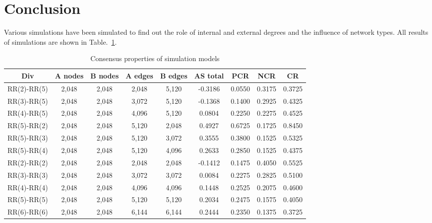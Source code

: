 \section{Conclusion}
Various simulations have been simulated to find out the role of internal and external degrees and the influence of network types. All results of simulations are shown in Table.~\ref{Consensus properties of Simulation Models}. 
\begin{table}[!htb]
	\scriptsize
	\centering
    \caption{Consensus properties of simulation models}
	\label{Consensus properties of Simulation Models}
	\begin{center}
		\begin{tabular}{c|c|c|c|c|c|c|c|c} \hline\hline
			Div                    & A nodes& B nodes & A edges & B edges & AS total  & PCR    & NCR    & CR       \\ \hline \hline
			RR(2)-RR(5)            & 2,048  & 2,048   & 2,048   & 5,120   & -0.3186   & 0.0550 & 0.3175 & 0.3725   \\ \hline
			RR(3)-RR(5)            & 2,048  & 2,048   & 3,072   & 5,120   & -0.1368   & 0.1400 & 0.2925 & 0.4325   \\ \hline
			RR(4)-RR(5)            & 2,048  & 2,048   & 4,096   & 5,120   &  0.0804   & 0.2250 & 0.2275 & 0.4525   \\ \hline
			RR(5)-RR(2)            & 2,048 	& 2,048   & 5,120   & 2,048   &  0.4927   & 0.6725 & 0.1725 & 0.8450   \\ \hline	
			RR(5)-RR(3)            & 2,048 	& 2,048   & 5,120   & 3,072   &  0.3555   & 0.3800 & 0.1525 & 0.5325   \\ \hline
			RR(5)-RR(4)            & 2,048  & 2,048   & 5,120   & 4,096   &  0.2633   & 0.2850 & 0.1525 & 0.4375   \\ \hline
			RR(2)-RR(2)            & 2,048  & 2,048   & 2,048   & 2,048   & -0.1412   & 0.1475 & 0.4050 & 0.5525   \\ \hline
			RR(3)-RR(3)            & 2,048  & 2,048   & 3,072   & 3,072   &  0.0084   & 0.2275 & 0.2825 & 0.5100   \\ \hline
			RR(4)-RR(4)            & 2,048  & 2,048   & 4,096   & 4,096   &  0.1448   & 0.2525 & 0.2075 & 0.4600   \\ \hline
			RR(5)-RR(5)            & 2,048  & 2,048   & 5,120   & 5,120   &  0.2034   & 0.2475 & 0.1575 & 0.4050   \\ \hline
			RR(6)-RR(6)            & 2,048  & 2,048   & 6,144   & 6,144   &  0.2444   & 0.2350 & 0.1375 & 0.3725   \\ \hline

\end{tabular}
\end{center}
\end{table}
